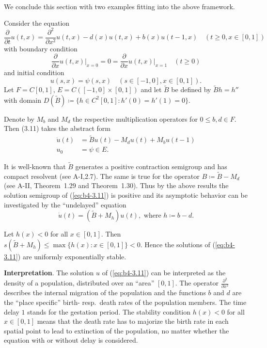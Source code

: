 \medskip 
We conclude this section with two examples fitting into the above framework.

\begin{example}\label{ex:b4-3.11}
	Consider the equation
	\[
	\frac{\partial}{\partial t}u(t,x) = \frac{\partial^2}{\partial x^2}u(t,x) - d(x)u(t,x) + b(x)u(t-1,x) \quad (t\geq0,x\in[0,1])
	\]
	with boundary condition
	\begin{equation}\label{eq:b4-3.11}
	\frac{\partial}{\partial x}u(t,x)\big|_{x=0} = 0 = \frac{\partial}{\partial x}u(t,x)\big|_{x=1} \quad (t\geq0)
	\end{equation}
	and initial condition
	\[
	u(s,x) = \psi(s,x) \quad (s\in[-1,0],x\in[0,1]) .
	\]
%
%
%
%
\newpage
%
Let $F = C[0,1]$, $E = C([-1,0]\times[0,1])$ and let $\tilde{B}$ be defined by $\tilde{B}h = h''$ with domain $D(\tilde{B}) \coloneq  \{h \in C^2[0,1] \colon h'(0) = h'(1) = 0\}$.

Denote by $M_b$ and $M_d$ the respective multiplication operators for $0 \leq b,d \in F$. 
Then (3.11) takes the abstract form
\begin{align*}
	\dot{u}(t) &= \tilde{B}u(t) - M_du(t) + M_bu(t-1)\\
	u_0 &= \psi \in E .
\end{align*}

It is well-known that $\tilde{B}$ generates a positive contraction semigroup and has compact resolvent (see A-I,2.7). 
The same is true for the operator $B  \coloneq  \tilde{B} - M_d$ (see A-II, Theorem~1.29 and Theorem~1.30). 
Thus by the above results the solution semigroup of (\ref{eq:b4-3.11}) is positive and its asymptotic behavior can be investigated by the \enquote{undelayed} equation
\[
\dot{u}(t) = (\tilde{B} + M_h)u(t) , \text{ where } h \coloneq  b - d .
\]

Let $h(x) < 0$ for all $x \in [0,1]$.
Then $s(\tilde{B} + M_h) \leq \max\{h(x) \colon x \in [0,1]\} < 0$. 
Hence the solutions of (\ref{eq:b4-3.11}) are uniformly exponentially stable.
\end{example}

\noindent
\textbf{Interpretation}.\quad
	The solution $u$ of (\ref{eq:b4-3.11}) can be interpreted as the density of a population, distributed over an \enquote{area} $[0,1]$.
	The operator $\frac{\partial^2}{\partial x^2}$ describes the internal migration of the population and the functions $b$ and $d$ are the \enquote{place specific} birth- resp.\ death rates of the population members. 
	The time delay $1$ stands for the gestation period. 
	The stability condition $h(x) < 0$ for all $x \in [0,1]$ means that the death rate has to majorize the birth rate in each spatial point to lead to extinction of the population, no matter whether the equation with or without delay is considered.

